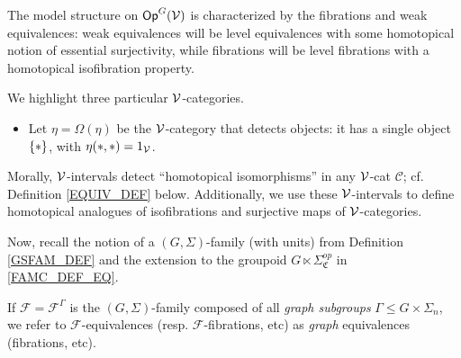 \documentclass[a4paper,10pt
,draft
]{article}%
\renewcommand{\F}{\mathcal F}
\newcommand{\I}{\mathbb I}
\renewcommand{\1}{\eta}%
\begin{document}
The model structure on $\mathsf{Op}^G(\mathcal V)$ is characterized by the fibrations and weak equivalences:
weak equivalences will be level equivalences with some homotopical notion of essential surjectivity,
while fibrations will be level fibrations with a homotopical isofibration property.


We highlight three particular $\mathcal V$-categories.

\begin{itemize} 
\item Let $\1 = \Omega(\eta)$ be the $\mathcal V$-category that detects objects: it has a single object $\set{\**}$, with $\1(\**, \**) = 1_\V$.
\end{itemize}









Morally, $\mathcal V$-intervals detect ``homotopical isomorphisms'' in any $\mathcal V$-cat $\mathcal C$; cf. Definition \ref{EQUIV_DEF} below.
Additionally, we use these $\mathcal V$-intervals to define homotopical analogues of isofibrations and surjective maps of $\mathcal V$-categories.




Now, recall the notion of a $(G, \Sigma)$-family (with units) from Definition \ref{GSFAM_DEF}
and the extension to the groupoid $G \ltimes \Sigma_{\mathfrak C}^{op}$ in \eqref{FAMC_DEF_EQ}.



\begin{remark}
      \label{GRAPHF_REM}
      If $\F = \F^\Gamma$ is the $(G, \Sigma)$-family composed of all \textit{graph subgroups} $\Gamma \leq G \times \Sigma_n$,
      we refer to $\F$-equivalences (resp. $\F$-fibrations, etc) as \textit{graph} equivalences (fibrations, etc).
\end{remark}

\end{document}
